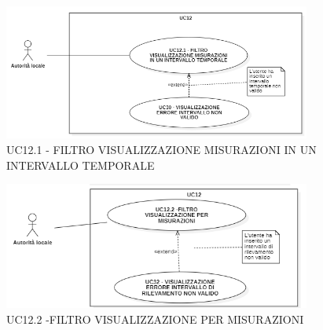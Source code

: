 

\newpage

\begin{figure}[H]
    \centering
    \includegraphics[width=0.9\textwidth]{../Images/uc12.1.PNG}
    \caption{UC12.1 - FILTRO VISUALIZZAZIONE MISURAZIONI IN UN INTERVALLO TEMPORALE }
\end{figure}






\begin{figure}[H]
    \centering
    \includegraphics[width=0.9\textwidth]{../Images/uc12.2.PNG}
    \caption{UC12.2 -FILTRO VISUALIZZAZIONE PER MISURAZIONI }
\end{figure}





\newpage

